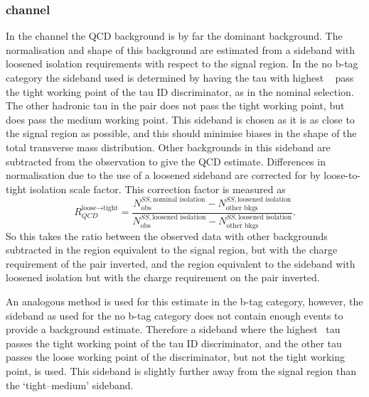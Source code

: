 \subsubsection{\texorpdfstring{\tautau channel}{tau tau channel}}
\label{sec:mssm_bkgs_qcd_tt}
In the \tautau channel the QCD background is by far the 
dominant background. The normalisation and shape 
of this background are estimated from a sideband with loosened 
isolation requirements with respect to the signal region. 
In the no b-tag category the sideband used is determined
by having the tau with highest \pT~ pass the tight working
point of the tau ID discriminator, as in the nominal selection.
The other hadronic tau in the pair does not pass the tight working point,
but does pass the medium working point. This sideband is 
chosen as it is as close to the signal region as possible, and 
this should minimise biases in the shape of the total transverse mass
distribution. Other backgrounds
in this sideband are subtracted from the observation to give
the QCD estimate. Differences in normalisation due to
the use of a loosened sideband are corrected for by loose-to-tight isolation
scale factor. This correction factor is measured as
\begin{equation}\label{eqn:tautau_qcd}
R_{QCD}^{\text{loose}\rightarrow\text{tight}} = \frac{N_{\text{obs}}^{SS,\text{nominal isolation}}-N_{\text{other bkgs}}^{SS,\text{loosened isolation}}}{N_{\text{obs}}^{SS,\text{loosened isolation}}-N_{\text{other bkgs}}^{SS,\text{loosened isolation}}}.
\end{equation}
So this takes the ratio between the observed data with other
backgrounds subtracted in the region equivalent to the signal region, but with the
charge requirement of the pair inverted, and the region equivalent to the sideband
with loosened isolation but with the charge requirement on the pair inverted.

An analogous method is used for this estimate in the 
b-tag category, however, the sideband as used for the 
no b-tag category does not contain enough events to 
provide a background estimate. Therefore a sideband where
the highest \pT~tau passes the tight working point of the
tau ID discriminator, and the other tau passes the loose working
point of the discriminator, but not the tight working point, is used.
This sideband is slightly further away from the signal region than the
`tight--medium' sideband. %

